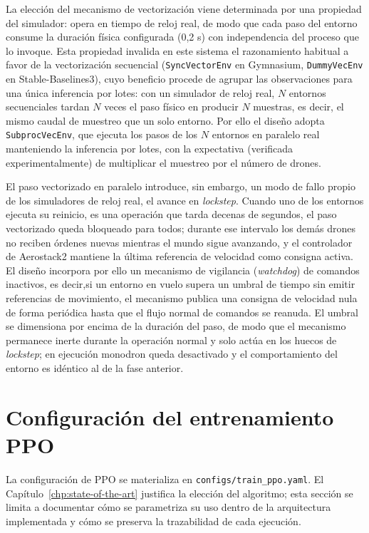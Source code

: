 La elección del mecanismo de vectorización viene determinada por una propiedad
del simulador: opera en tiempo de reloj real, de modo que cada paso del entorno
consume la duración física configurada (0,2 s) con independencia del proceso que
lo invoque. Esta propiedad invalida en este sistema el razonamiento habitual a
favor de la vectorización secuencial (\texttt{SyncVectorEnv} en Gymnasium,
\texttt{DummyVecEnv} en Stable-Baselines3), cuyo beneficio procede de agrupar las
observaciones para una única inferencia por lotes: con un simulador de reloj
real, $N$ entornos secuenciales tardan $N$ veces el paso físico en producir $N$
muestras, es decir, el mismo caudal de muestreo que un solo entorno. Por ello el
diseño adopta \texttt{SubprocVecEnv}, que ejecuta los pasos de los $N$ entornos
en paralelo real manteniendo la inferencia por lotes, con la expectativa
(verificada experimentalmente) de multiplicar el muestreo por el número de
drones.

El paso vectorizado en paralelo introduce, sin embargo, un modo de fallo propio
de los simuladores de reloj real, el avance en \emph{lockstep}. Cuando uno de los
entornos ejecuta su reinicio, es una operación que tarda decenas de
segundos, el paso vectorizado queda bloqueado para todos; durante ese intervalo
los demás drones no reciben órdenes nuevas mientras el mundo sigue avanzando, y
el controlador de Aerostack2 mantiene la última referencia de velocidad como
consigna activa. El diseño incorpora por ello un mecanismo de vigilancia
(\emph{watchdog}) de comandos inactivos, es decir,si un entorno en vuelo supera un umbral
de tiempo sin emitir referencias de movimiento, el mecanismo publica una consigna
de velocidad nula de forma periódica hasta que el flujo normal de comandos se
reanuda. El umbral se dimensiona por encima de la duración del paso, de modo que
el mecanismo permanece inerte durante la operación normal y solo actúa en los
huecos de \emph{lockstep}; en ejecución monodron queda desactivado y el
comportamiento del entorno es idéntico al de la fase anterior.

\section{Configuración del entrenamiento PPO} \label{sct:aplicacion:ppo}

La configuración de PPO se materializa en
\texttt{configs/train\_ppo.yaml}. El Capítulo~\ref{chp:state-of-the-art}
justifica la elección del algoritmo; esta sección se limita a documentar cómo se
parametriza su uso dentro de la arquitectura implementada y cómo se preserva la
trazabilidad de cada ejecución.

